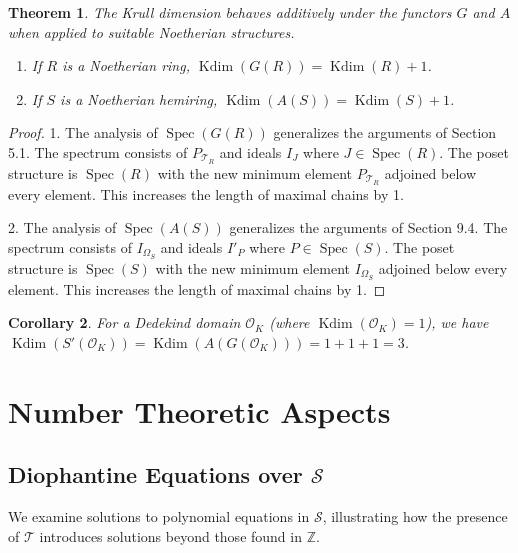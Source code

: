 \documentclass[11pt, a4paper]{article}
\theoremstyle{plain}
\newtheorem{theorem}{Theorem}[section]
\newtheorem{corollary}[theorem]{Corollary}
\theoremstyle{definition}
\numberwithin{equation}{section}
\newcommand{\Z}{\mathbb{Z}}
\newcommand{\Tobj}{\mathcal{T}} %
\newcommand{\SemiringS}{\mathcal{S}}
\DeclareMathOperator{\Spec}{Spec}
\DeclareMathOperator{\KrullDim}{Kdim}
\newcommand{\OK}{\mathcal{O}_K}
\newcommand{\SPOK}{S'(\OK)}
\begin{document}
\begin{theorem}\label{thm:KrullDim_Functors}
The Krull dimension behaves additively under the functors $G$ and $A$ when applied to suitable Noetherian structures.
\begin{enumerate}
    \item If $R$ is a Noetherian ring, $\KrullDim(G(R)) = \KrullDim(R) + 1$.
    \item If $S$ is a Noetherian hemiring, $\KrullDim(A(S)) = \KrullDim(S) + 1$.
\end{enumerate}
\end{theorem}
\begin{proof}
1. The analysis of $\Spec(G(R))$ generalizes the arguments of Section 5.1. The spectrum consists of $P_{\Tobj_R}$ and ideals $I_J$ where $J \in \Spec(R)$. The poset structure is $\Spec(R)$ with the new minimum element $P_{\Tobj_R}$ adjoined below every element. This increases the length of maximal chains by 1.

2. The analysis of $\Spec(A(S))$ generalizes the arguments of Section 9.4. The spectrum consists of $I_{\Omega_S}$ and ideals $I'_P$ where $P \in \Spec(S)$. The poset structure is $\Spec(S)$ with the new minimum element $I_{\Omega_S}$ adjoined below every element. This increases the length of maximal chains by 1.
\end{proof}

\begin{corollary}
For a Dedekind domain $\OK$ (where $\KrullDim(\OK)=1$), we have $\KrullDim(\SPOK) = \KrullDim(A(G(\OK))) = 1+1+1 = 3$.
\end{corollary}

\section{Number Theoretic Aspects}

\subsection{Diophantine Equations over $\SemiringS$}

We examine solutions to polynomial equations in $\SemiringS$, illustrating how the presence of $\Tobj$ introduces solutions beyond those found in $\Z$.
\end{document}
